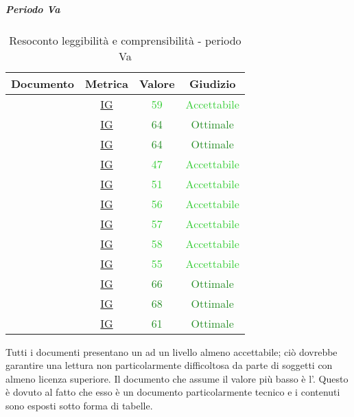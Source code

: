 					\subparagraph{Periodo Va}
					
					\begin{table}[H]
						\centering
						\small
						\begin{tabular}{c | c | c | c}
							\hline
							\textbf{Documento} & \textbf{Metrica}    & \textbf{Valore} & \textbf{Giudizio} \\ \hline
							\pdpv        & \hyperref[MLEC]{IG} & \textcolor{LimeGreen}{59} & \textcolor{LimeGreen}{Accettabile} \\
							\pdqv        & \hyperref[MLEC]{IG} & \textcolor{ForestGreen}{64} & \textcolor{ForestGreen}{Ottimale} \\
							\ndpv        & \hyperref[MLEC]{IG} & \textcolor{ForestGreen}{64} & \textcolor{ForestGreen}{Ottimale} \\
							\adrv        & \hyperref[MLEC]{IG}  & \textcolor{LimeGreen}{47} & \textcolor{LimeGreen}{Accettabile} \\
							\stv		& \hyperref[MLEC]{IG}  & \textcolor{LimeGreen}{51} & \textcolor{LimeGreen}{Accettabile} \\
							\glv       & \hyperref[MLEC]{IG} & \textcolor{LimeGreen}{56} & \textcolor{LimeGreen}{Accettabile} \\
							\ddpv        & \hyperref[MLEC]{IG} & \textcolor{LimeGreen}{57} & \textcolor{LimeGreen}{Accettabile} \\
							\manutv        & \hyperref[MLEC]{IG} & \textcolor{LimeGreen}{58} & \textcolor{LimeGreen}{Accettabile} \\
							\manmanv        & \hyperref[MLEC]{IG} & \textcolor{LimeGreen}{55} & \textcolor{LimeGreen}{Accettabile} \\
							\vnovei       & \hyperref[MLEC]{IG}& \textcolor{ForestGreen}{66} & \textcolor{ForestGreen}{Ottimale} \\
							\vcinquee       & \hyperref[MLEC]{IG}& \textcolor{ForestGreen}{68} & \textcolor{ForestGreen}{Ottimale} \\
							\vseie       & \hyperref[MLEC]{IG}& \textcolor{ForestGreen}{61} & \textcolor{ForestGreen}{Ottimale} \\
						\end{tabular}
						\caption{Resoconto leggibilità e comprensibilità - periodo Va}
						\label{tab_resoconto_leggibilità_e_comprensibilità_PVA}
					\end{table}
				Tutti i documenti presentano un  ad un livello almeno accettabile; ciò dovrebbe garantire una lettura non particolarmente difficoltosa da parte di soggetti con almeno licenza superiore.
				Il documento che assume il valore più basso è l'\adrv. Questo è dovuto al fatto che esso è un documento particolarmente tecnico e i contenuti sono esposti sotto forma di tabelle.
						
